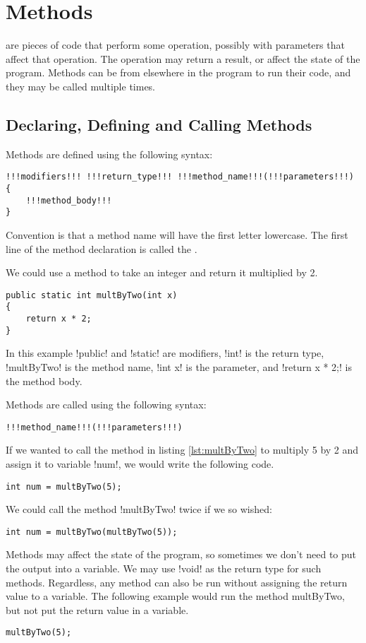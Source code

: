 \documentclass[11pt]{article}
\begin{document}
\section{Methods}
\label{sec:methods}
 are pieces of code that perform some operation, possibly with parameters that affect that operation. The operation may return a result, or affect the state of the program. Methods can be  from elsewhere in the program to run their code, and they may be called multiple times.
\subsection{Declaring, Defining and Calling Methods}
Methods are defined using the following syntax:
\vspace{-15pt}
\begin{lstlisting}[style=javaSyntax]
!!!modifiers!!! !!!return_type!!! !!!method_name!!!(!!!parameters!!!) 
{
    !!!method_body!!!
}
\end{lstlisting}
Convention is that a method name will have the first letter lowercase. The first line of the method declaration is called the .
\begin{eg} We could use a method to take an integer and return it multiplied by 2.
\begin{lstlisting}[caption=An example method, label=lst:multByTwo]
public static int multByTwo(int x)
{
    return x * 2;
}
\end{lstlisting}
In this example \inlineJava!public! and \inlineJava!static! are modifiers, \inlineJava!int! is the return type, \inlineJava!multByTwo! is the method name, \inlineJava!int x! is the parameter, and \inlineJava!return x * 2;! is the method body.
\end{eg}
\noindent Methods are called using the following syntax:
\vspace{-15pt}
\begin{lstlisting}[style=javaSyntax]
!!!method_name!!!(!!!parameters!!!) 
\end{lstlisting}
\begin{eg} If we wanted to call the method in listing \ref{lst:multByTwo} to multiply 5 by 2 and assign it to variable \inlineJava!num!, we would write the following code.
\vspace{-15pt}
\begin{lstlisting}
int num = multByTwo(5);
\end{lstlisting}
We could call the method \inlineJava!multByTwo! twice if we so wished:
\vspace{-15pt}
\begin{lstlisting}
int num = multByTwo(multByTwo(5));
\end{lstlisting}
Methods may affect the state of the program, so sometimes we don't need to put the output into a variable. We may use \inlineJava!void! as the return type for such methods. Regardless, any method can also be run without assigning the return value to a variable. The following example would run the method multByTwo, but not put the return value in a variable.
\vspace{-15pt}
\begin{lstlisting}
multByTwo(5);
\end{lstlisting}
\end{eg}
\end{document}
